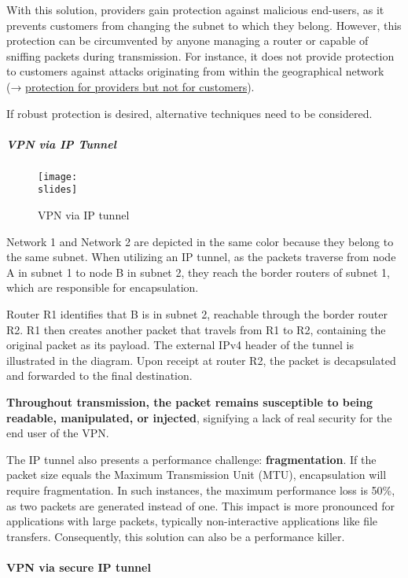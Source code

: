 With this solution, providers gain protection against malicious end-users, as it prevents customers from changing the subnet to which they belong.
However, this protection can be circumvented by anyone managing a router or capable of sniffing packets during transmission. For instance, it does not provide protection to customers against attacks originating from within the geographical network (→ \ul{protection for providers but not for customers}).

If robust protection is desired, alternative techniques need to be considered.


\subparagraph{VPN via IP Tunnel}

\begin{figure}[h]
    \centering
    \texttt{[image: \\slides]}
    \caption{VPN via IP tunnel}
\end{figure}

Network 1 and Network 2 are depicted in the same color because they belong to the same subnet. When utilizing an IP tunnel, as the packets traverse from node A in subnet 1 to node B in subnet 2, they reach the border routers of subnet 1, which are responsible for encapsulation.

Router R1 identifies that B is in subnet 2, reachable through the border router R2. R1 then creates another packet that travels from R1 to R2, containing the original packet as its payload. The external IPv4 header of the tunnel is illustrated in the diagram. Upon receipt at router R2, the packet is decapsulated and forwarded to the final destination.

\textbf{Throughout transmission, the packet remains susceptible to being readable, manipulated, or injected}, signifying a lack of real security for the end user of the VPN.

The IP tunnel also presents a performance challenge: \textbf{fragmentation}. If the packet size equals the Maximum Transmission Unit (MTU), encapsulation will require fragmentation. In such instances, the maximum performance loss is 50\%, as two packets are generated instead of one. This impact is more pronounced for applications with large packets, typically non-interactive applications like file transfers. Consequently, this solution can also be a performance killer.


\paragraph{VPN via secure IP tunnel}

